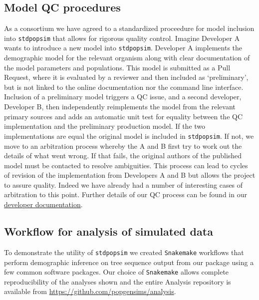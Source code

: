 \documentclass[12pt,halfline,a4paper]{ouparticle}
\newcommand{\stdpopsim}{\texttt{stdpopsim}\xspace}
\begin{document}
\subsection*{Model QC procedures}
As a consortium we have agreed to a standardized proceedure for model inclusion
into \stdpopsim that allows for rigorous quality control. Imagine Developer A
wants to introduce a new model into \stdpopsim. Developer A implements the
demographic model for the relevant organism along with clear documentation
of the model parameters and populations. This model is submitted as a Pull Request,
where it is evaluated by a reviewer and then included as `preliminary',
but is not linked to the online documentation nor the command line interface.
Inclusion of a preliminary model triggers a QC issue, and a second developer,
Developer B, then independently reimplements the model from the relevant
primary sources and adds an automatic unit test for equality between the
QC implementation and the preliminary production model. If the two
implementations are equal the original model is included in \stdpopsim.
If not, we move to an arbitration process whereby the A and B first try
to work out the details of what went wrong. If that fails, the original
authors of the published model must be contacted
to resolve ambiguities. This process can lead to cycles of revision of
the implementation from Developers A and B but allows the project to assure
quality. Indeed we have already had a number of interesting cases of arbitration
to this point. Further details of our QC process can be found in our
\href{https://stdpopsim.readthedocs.io/en/latest/development.html#}{developer documentation}.

\subsection*{Workflow for analysis of simulated data}
To demonstrate the utility of \stdpopsim we created \texttt{Snakemake}
workflows \citep{koster2012snakemake} that perform demographic inference on
tree sequence output from our package using a few common software packages.
Our choice of \texttt{Snakemake} allows complete reproducibility of the
analyses shown and the entire Analysis repository is available from
\url{https://github.com/popgensims/analysis}.
\end{document}
